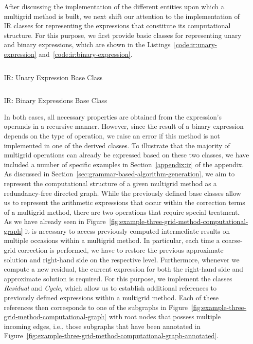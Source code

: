 After discussing the implementation of the different entities upon which a multigrid method is built, we next shift our attention to the implementation of IR classes for representing the expressions that constitute its computational structure. 
For this purpose, we first provide basic classes for representing unary and binary expressions, which are shown in the Listings~\ref{code:ir:unary-expression} and~\ref{code:ir:binary-expression}.
\begin{listing}
	\inputminted{python}{evostencils/ir/unary_expression.py}
	\caption{IR: Unary Expression Base Class}
	\label{code:ir:unary-expression}
\end{listing}
\begin{listing}
	\inputminted{python}{evostencils/ir/binary_expression.py}
	\caption{IR: Binary Expressions Base Class}
	\label{code:ir:binary-expression}
\end{listing}
In both cases, all necessary properties are obtained from the expression's operands in a recursive manner.
However, since the result of a binary expression depends on the type of operation, we raise an error if this method is not implemented in one of the derived classes. 
To illustrate that the majority of multigrid operations can already be expressed based on these two classes, we have included a number of specific examples in Section~\ref{appendix:ir} of the appendix.
As discussed in Section~\ref{sec:grammar-based-algorithm-generation}, we aim to represent the computational structure of a given multigrid method as a redundancy-free directed graph. 
While the previously defined base classes allow us to represent the arithmetic expressions that occur within the correction terms of a multigrid method, there are two operations that require special treatment.
As we have already seen in Figure~\ref{fig:example-three-grid-method-computational-graph} it is necessary to access previously computed intermediate results on multiple occasions within a multigrid method.
In particular, each time a coarse-grid correction is performed, we have to restore the previous approximate solution and right-hand side on the respective level.
Furthermore, whenever we compute a new residual, the current expression for both the right-hand side and approximate solution is required.
For this purpose, we implement the classes \emph{Residual} and \emph{Cycle}, which allow us to establish additional references to previously defined expressions within a multigrid method.
Each of these references then corresponds to one of the subgraphs in Figure~\ref{fig:example-three-grid-method-computational-graph} with root nodes that possess multiple incoming edges, i.e., those subgraphs that have been annotated in Figure~\ref{fig:example-three-grid-method-computational-graph-annotated}.
